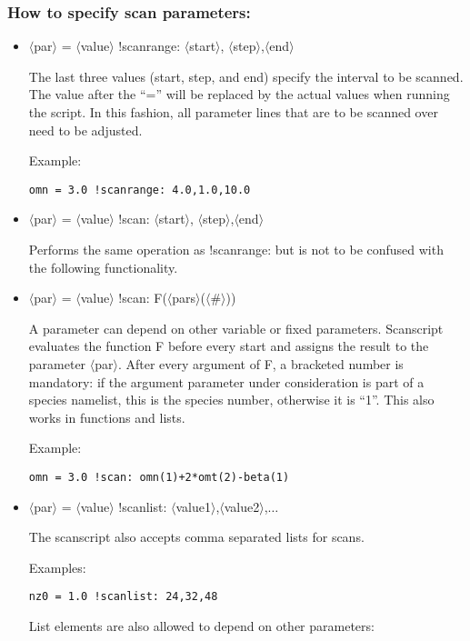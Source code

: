\documentclass[12pt]{article}
\begin{document}
\subsubsection{How to specify scan parameters:} \label{sec:scandef}

\begin{itemize}
\item $\langle$par$\rangle$ = $\langle$value$\rangle$ !scanrange: $\langle$start$\rangle$,
$\langle$step$\rangle $,$\langle$end$\rangle$

The last three values (start, step, and end) specify the interval to be scanned. The value after
the ``='' will be replaced by the actual values when running the script. In this fashion,
all parameter lines that are to be scanned over need to be adjusted.

Example:

\texttt{omn = 3.0 !scanrange: 4.0,1.0,10.0}

\item $\langle$par$\rangle$ = $\langle$value$\rangle$ !scan: $\langle$start$\rangle$,
$\langle$step$\rangle $,$\langle$end$\rangle$

Performs the same operation as !scanrange: but is not to be confused
with the following functionality.

\item $\langle$par$\rangle$ = $\langle$value$\rangle$ !scan:
F($\langle$pars$\rangle$($\langle$\#$\rangle$))

A parameter can depend on other variable or fixed parameters.
Scanscript evaluates the function F before every \gene start and assigns
the result to the parameter $\langle$par$\rangle$.
After every argument of F, a bracketed number is mandatory: if the
argument parameter under consideration is part of a species namelist,
this is the
species number, otherwise it is ``1''.
This also works in functions and lists.

Example:

\texttt{omn = 3.0 !scan: omn(1)+2*omt(2)-beta(1)}

\item
$\langle$par$\rangle$ = $\langle$value$\rangle$ !scanlist: $\langle
$value1$\rangle$,$\langle$value2$\rangle$,$\ldots$

The scanscript also accepts comma separated lists for scans.

Examples:

\texttt{nz0 = 1.0 !scanlist: 24,32,48}

List elements are also allowed to depend on other parameters:


\end{itemize}
\end{document}
